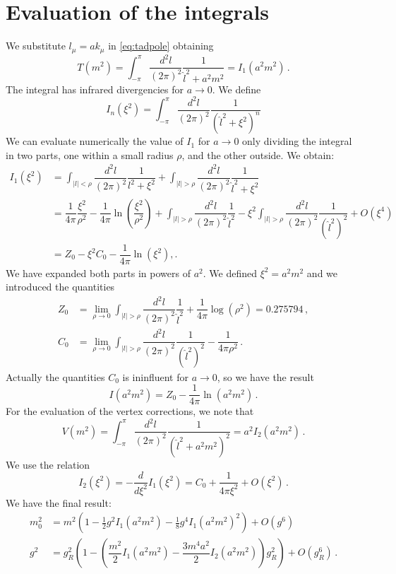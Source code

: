 \documentclass[12pt,a4paper]{report}
\begin{document}
 \section{Evaluation of the integrals}
 
 We substitute $l_\mu = a k_\mu$ in \eqref{eq:tadpole} obtaining \begin{equation}
 T( m^2) =  \int_{-\pi}^\pi \dfrac{d^2l}{(2 \pi)^2}\dfrac{1}{\hat l^2 + a^2m^2} =  I_1(a^2 m^2) \,.
 \end{equation} The integral has infrared divergencies for $a \to 0$. We define \begin{equation}
 I_n(\xi^2) = \int_{-\pi}^\pi \dfrac{d^2l}{(2 \pi)^2}\dfrac{1}{(\hat l^2 + \xi^2)^n}
\end{equation}  We can evaluate numerically the value of $I_1$ for $a\to 0$ only dividing the integral in two parts, one within a small radius $\rho$, and the other outside.
 We obtain:
 \begin{align}
 I_1(\xi^2) &= \int_{|l|< \rho} \dfrac{d^2l}{(2 \pi)^2} \dfrac{1}{l^2 + \xi^2} +\int_{|l|> \rho} \dfrac{d^2l}{(2 \pi)^2} \dfrac{1}{\hat l^2 + \xi^2}  \\
 &= \dfrac{1}{4 \pi} \dfrac{\xi^2}{\rho^2} - \dfrac{1}{4 \pi} \ln \left( \dfrac{\xi^2}{\rho^2}\right) + \int_{|l|> \rho} \dfrac{d^2l}{(2 \pi)^2} \dfrac{1}{\hat l^2 } - \xi^2 \int_{|l|> \rho} \dfrac{d^2l}{(2 \pi)^2} \dfrac{1}{(\hat l^2)^2}  +O(\xi^4) \nonumber \\
 &= Z_0 -\xi^2 C_0 -\dfrac{1}{4 \pi} \ln(\xi^2) ,. \nonumber
 \end{align} We have expanded both parts in powers of $a^2$. We defined $\xi^2 = a^2 m^2$ and we introduced the quantities
\begin{align}
Z_0 &= \lim_{\rho \to 0} \int_{|l|> \rho}  \dfrac{d^2l}{(2 \pi)^2} \dfrac{1}{\hat l^2 } + \dfrac{1}{4 \pi} \log(\rho^2)=0.275794 \,, \\
C_0 &= \lim_{\rho \to 0}  \int_{|l|> \rho}  \dfrac{d^2l}{(2 \pi)^2} \dfrac{1}{(\hat l^2)^2 } - \dfrac{1}{4 \pi \rho^2} \,.
\end{align} Actually the quantities $C_0$ is ininfluent for $a\to 0$, so we have the result \begin{equation}
I(a^2 m^2)= Z_0 - \dfrac{1}{4 \pi} \ln(a^2m^2) \,.
\end{equation} For the evaluation of the vertex corrections, we note that \begin{equation}
V(m^2) = \int_{-\pi}^\pi \dfrac{d^2l}{(2 \pi)^2}\dfrac{1}{(\hat l^2 + a^2m^2)^2} = a^2 I_2(a^2 m^2) \,.
\end{equation} We use the relation \begin{equation}
I_2(\xi^2) = - \dfrac{d}{d\xi^2} I_1(\xi^2) = C_0 + \dfrac{1}{4 \pi \xi^2} + O(\xi^2) \,.
\end{equation} We have the final result: \begin{align}
  m_0^2 &=  m^2(1 - \frac{1}{2}g^2 I_1( a^2 m^2) - \frac{1}{8} g^4 I_1(a^2 m^2)^2 ) + O( g^6 ) \\
g^2 &= g_R^2(1- (\dfrac{m^2}{2}I_1(a^2 m^2) - \dfrac{3m^4a^2}{2} I_2(a^2m^2) )g_R^2) + O(g_R^6) \,.
\end{align}
 
 
 
\end{document}
